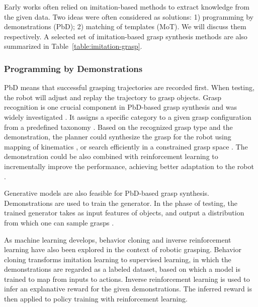 \documentclass[letterpaper,10pt]{article}
\newcommand{\tabref}[1]{Table~\ref{#1}}
\begin{document}
Early works often relied on imitation-based methods to extract knowledge from the given data.
Two ideas were often considered as solutions: 1) programming by demonstrations (PbD); 2) matching of templates (MoT).
We will discuss them respectively.
A selected set of imitation-based grasp synthesis methods are also summarized in \tabref{table:imitation-grasp}.

\subsubsection{Programming by Demonstrations}
\label{sec:pbd}

PbD means that successful grasping trajectories are recorded first.
When testing, the robot will adjust and replay the trajectory to grasp objects.
Grasp recognition is one crucial component in PbD-based grasp synthesis and was widely investigated \cite{kang1993toward, zollner2001dynamic, ekvall2005grasp, aleotti2006grasp, de2006learning}.
It assigns a specific category to a given grasp configuration from a predefined taxonomy \cite{cutkosky1989grasp, zollner2001dynamic, feix2009comprehensive}.
Based on the recognized grasp type and the demonstration, the planner could synthesize the grasp for the robot using mapping of kinematics \cite{aleotti2006grasp}, or search efficiently in a constrained grasp space \cite{lin2014grasp, lin2015robot}.
The demonstration could be also combined with reinforcement learning to incrementally improve the performance, achieving better adaptation to the robot \cite{grave2010improving}.

Generative models are also feasible for PbD-based grasp synthesis.
Demonstrations are used to train the generator.
In the phase of testing, the trained generator takes as input features of objects, and output a distribution from which one can sample grasps \cite{sweeney2007model, schmidts2011imitation, arruda2019generative}.

As machine learning develops, behavior cloning \cite{zhang2018deep} and inverse reinforcement learning \cite{abbeel2004apprenticeship, horn2017quantifying, xie2019learning} have also been explored in the context of robotic grasping.
Behavior cloning transforms imitation learning to supervised learning, in which the demonstrations are regarded as a labeled dataset, based on which a model is trained to map from inputs to actions.
Inverse reinforcement learning is used to infer an explanative reward for the given demonstrations. The inferred reward is then applied to policy training with reinforcement learning.
\end{document}
